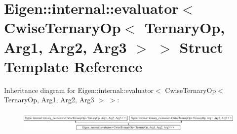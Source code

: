 \hypertarget{struct_eigen_1_1internal_1_1evaluator_3_01_cwise_ternary_op_3_01_ternary_op_00_01_arg1_00_01_arg2_00_01_arg3_01_4_01_4}{}\section{Eigen\+:\+:internal\+:\+:evaluator$<$ Cwise\+Ternary\+Op$<$ Ternary\+Op, Arg1, Arg2, Arg3 $>$ $>$ Struct Template Reference}
\label{struct_eigen_1_1internal_1_1evaluator_3_01_cwise_ternary_op_3_01_ternary_op_00_01_arg1_00_01_arg2_00_01_arg3_01_4_01_4}
Inheritance diagram for Eigen\+:\+:internal\+:\+:evaluator$<$ Cwise\+Ternary\+Op$<$ Ternary\+Op, Arg1, Arg2, Arg3 $>$ $>$\+:\begin{figure}[H]
\begin{center}
\leavevmode
\includegraphics[height=1.068702cm]{struct_eigen_1_1internal_1_1evaluator_3_01_cwise_ternary_op_3_01_ternary_op_00_01_arg1_00_01_arg2_00_01_arg3_01_4_01_4}
\end{center}
\end{figure}
